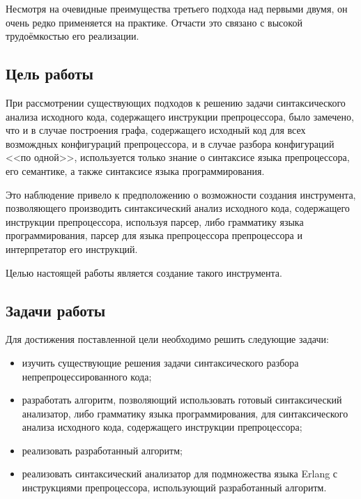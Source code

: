 Несмотря на очевидные преимущества третьего подхода над первыми двумя, он очень редко применяется на практике. Отчасти это связано с высокой трудоёмкостью его реализации.

\subsection{Цель работы}

При рассмотрении существующих подходов к решению задачи синтаксического анализа исходного кода, содержащего инструкции препроцессора, было замечено, что и в случае построения графа, содержащего исходный код для всех возмождных конфигураций препроцессора, и в случае разбора конфигураций <<по одной>>, используется только знание о синтаксисе языка препроцессора, его семантике, а также синтаксисе языка программирования.

Это наблюдение привело к предположению о возможности создания инструмента, позволяющего производить синтаксический анализ исходного кода, содержащего инструкции препроцессора, используя парсер, либо грамматику языка программирования, парсер для языка препроцессора препроцессора и интерпретатор его инструкций.

Целью настоящей работы является создание такого инструмента.

\subsection{Задачи работы}

Для достижения поставленной цели необходимо решить следующие задачи:

\begin{itemize}

\item изучить существующие решения задачи синтаксического разбора непрепроцессированного кода;

\item разработать алгоритм, позволяющий использовать готовый синтаксический анализатор, либо грамматику языка программирования, для синтаксического анализа исходного кода, содержащего инструкции препроцессора;

\item реализовать разработанный алгоритм;

\item реализовать синтаксический анализатор для подмножества языка Erlang с инструкциями препроцессора, использующий разработанный алгоритм.

\end{itemize}
